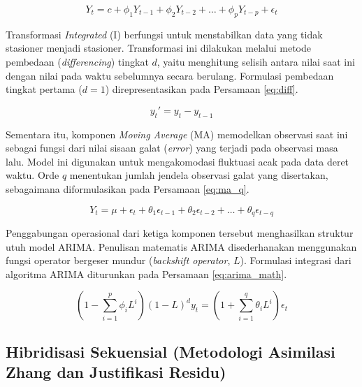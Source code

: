 \begin{equation}
Y_t = c + \phi_1 Y_{t-1} + \phi_2 Y_{t-2} + \dots + \phi_p Y_{t-p} + \epsilon_t
\label{eq:ar_p}
\end{equation}

Transformasi \textit{Integrated} (I) berfungsi untuk menstabilkan data yang tidak stasioner menjadi stasioner. Transformasi ini dilakukan melalui metode pembedaan (\textit{differencing}) tingkat $d$, yaitu menghitung selisih antara nilai saat ini dengan nilai pada waktu sebelumnya secara berulang. Formulasi pembedaan tingkat pertama ($d=1$) direpresentasikan pada Persamaan \ref{eq:diff}.

\begin{equation}
y_t' = y_t - y_{t-1}
\label{eq:diff}
\end{equation}

\newpage

Sementara itu, komponen \textit{Moving Average} (MA) memodelkan observasi saat ini sebagai fungsi dari nilai sisaan galat (\textit{error}) yang terjadi pada observasi masa lalu. Model ini digunakan untuk mengakomodasi fluktuasi acak pada data deret waktu. Orde $q$ menentukan jumlah jendela observasi galat yang disertakan, sebagaimana diformulasikan pada Persamaan \ref{eq:ma_q}.

\begin{equation}
Y_t = \mu + \epsilon_t + \theta_1 \epsilon_{t-1} + \theta_2 \epsilon_{t-2} + \dots + \theta_q \epsilon_{t-q}
\label{eq:ma_q}
\end{equation}

Penggabungan operasional dari ketiga komponen tersebut menghasilkan struktur utuh model ARIMA. Penulisan matematis ARIMA disederhanakan menggunakan fungsi operator bergeser mundur (\textit{backshift operator}, $L$). Formulasi integrasi dari algoritma ARIMA diturunkan pada Persamaan \ref{eq:arima_math}.

\begin{equation}
\left( 1 - \sum_{i=1}^p \phi_i L^i \right) (1-L)^d y_t = \left( 1 + \sum_{i=1}^q \theta_i L^i \right) \epsilon_t
\label{eq:arima_math}
\end{equation}

\subsection{Hibridisasi Sekuensial (Metodologi Asimilasi Zhang dan Justifikasi Residu)}

